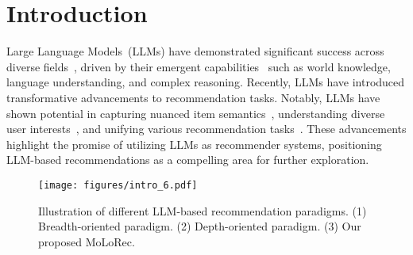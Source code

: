 \section{Introduction}
Large Language Models~(LLMs) have demonstrated significant success across diverse fields~\cite{zhao2023survey}, driven by their emergent capabilities~\cite{dong2024survey,huang-chang-2023-towards} such as world knowledge, language understanding, and complex reasoning. 
Recently, LLMs have introduced transformative advancements to recommendation tasks. Notably, LLMs have shown potential in capturing nuanced item semantics~\cite{10.1145/3640457.3688104}, understanding diverse user interests~\cite{deng2022toward}, and unifying various recommendation tasks~\cite{geng2022recommendation}.
These advancements highlight the promise of utilizing LLMs as recommender systems, positioning LLM-based recommendations as a compelling area for further exploration.

\begin{figure*}[ht]
    \centering \texttt{[image: figures/intro\_6.pdf]}
    \caption{Illustration of different LLM-based recommendation paradigms. (1) Breadth-oriented paradigm. (2) Depth-oriented paradigm. (3) Our proposed MoLoRec.}
    \label{fig:intro}
    \Description{}
\end{figure*}

